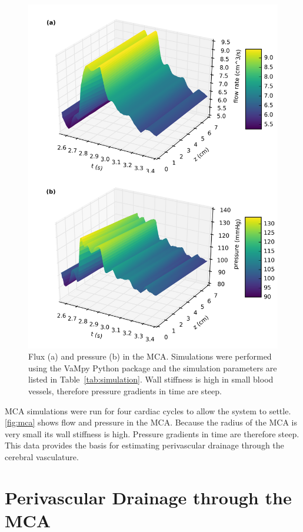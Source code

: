 \documentclass[a4paper,titlepage]{scrartcl}
\begin{document}
\begin{figure}
\centerline{\includegraphics{figures/mca.png}}
\caption{Flux (a) and pressure (b) in the MCA. Simulations were performed using the VaMpy Python package \cite{Diem2016a} and the simulation parameters are listed in Table~\ref{tab:simulation}. Wall stiffness is high in small blood vessels, therefore pressure gradients in time are steep.\label{fig:mca}}
\end{figure}

MCA simulations were run for four cardiac cycles to allow the system to settle. \autoref{fig:mca} shows flow and pressure in the MCA. Because the radius of the MCA is very small its wall stiffness is high. Pressure gradients in time are therefore steep. This data provides the basis for estimating perivascular drainage through the cerebral vasculature.


\section{Perivascular Drainage through the MCA}
\end{document}
